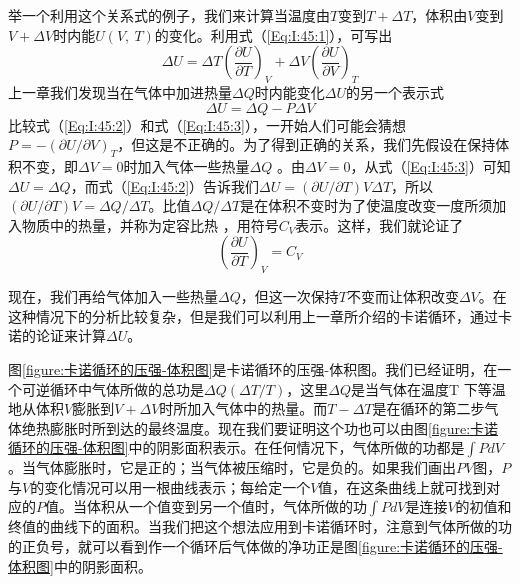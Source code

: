 举一个利用这个关系式的例子，我们来计算当温度由$T$变到$T +\Delta T$，体积由$V$变到$V +\Delta V$时内能$U(V,~T)$的变化。利用式（\ref{Eq:I:45:1}），可写出
\begin{equation}
    \label{Eq:I:45:2}
    \Delta U = \Delta T \left(\frac{\partial U}{\partial T}\right)_V + \Delta V \left(\frac{\partial U}{\partial V}\right)_T
\end{equation}
上一章我们发现当在气体中加进热量$\Delta Q$时内能变化$\Delta U$的另一个表示式
\begin{equation}
    \label{Eq:I:45:3}
    \Delta U = \Delta Q - P\Delta V
\end{equation}
比较式（\ref{Eq:I:45:2}）和式（\ref{Eq:I:45:3}），一开始人们可能会猜想$P=-(\partial U/\partial V)_T$，但这是不正确的。为了得到正确的关系，我们先假设在保持体积不变，即$\Delta V =0$时加入气体一些热量$\Delta Q$ 。由$\Delta V =0$，从式（\ref{Eq:I:45:3}）可知$\Delta U =\Delta Q$，而式（\ref{Eq:I:45:2}）告诉我们$\Delta U =(\partial U /\partial T) V \Delta T$，所以$(\partial U /\partial T) V =\Delta Q /\Delta T$。比值$\Delta Q /\Delta T$是在体积不变时为了使温度改变一度所须加入物质中的热量，并称为定容比热 ，用符号$C_V$表示。这样，我们就论证了
\begin{equation}
    \label{Eq:I:45:4}
    \left(\frac{\partial U}{\partial T}\right)_V = C_V
\end{equation}

现在，我们再给气体加入一些热量$\Delta Q$，但这一次保持$T$不变而让体积改变$\Delta V$。在这种情况下的分析比较复杂，但是我们可以利用上一章所介绍的卡诺循环，通过卡诺的论证来计算$\Delta U$。

图\ref{figure:卡诺循环的压强-体积图}是卡诺循环的压强-体积图。我们已经证明，在一个可逆循环中气体所做的总功是$\Delta Q(\Delta T /T)$，这里$\Delta Q$是当气体在温度T 下等温地从体积$V$膨胀到$V +\Delta V$时所加入气体中的热量。而$T -\Delta T$是在循环的第二步气体绝热膨胀时所到达的最终温度。现在我们要证明这个功也可以由图\ref{figure:卡诺循环的压强-体积图}中的阴影面积表示。在任何情况下，气体所做的功都是$\int P dV$。当气体膨胀时，它是正的；当气体被压缩时，它是负的。如果我们画出$PV$图，$P$与$V$的变化情况可以用一根曲线表示；每给定一个$V$值，在这条曲线上就可找到对应的$P$值。当体积从一个值变到另一个值时，气体所做的功$\int Pd V$是连接$V$的初值和终值的曲线下的面积。当我们把这个想法应用到卡诺循环时，注意到气体所做的功的正负号，就可以看到作一个循环后气体做的净功正是图\ref{figure:卡诺循环的压强-体积图}中的阴影面积。

